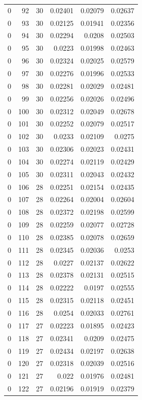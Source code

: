 \begin{tabular}{rrrrrr}
0 & 92 & 30 & 0.02401 & 0.02079 & 0.02637 \\
0 & 93 & 30 & 0.02125 & 0.01941 & 0.02356 \\
0 & 94 & 30 & 0.02294 & 0.0208 & 0.02503 \\
0 & 95 & 30 & 0.0223 & 0.01998 & 0.02463 \\
0 & 96 & 30 & 0.02324 & 0.02025 & 0.02579 \\
0 & 97 & 30 & 0.02276 & 0.01996 & 0.02533 \\
0 & 98 & 30 & 0.02281 & 0.02029 & 0.02481 \\
0 & 99 & 30 & 0.02256 & 0.02026 & 0.02496 \\
0 & 100 & 30 & 0.02312 & 0.02049 & 0.02678 \\
0 & 101 & 30 & 0.02252 & 0.02079 & 0.02517 \\
0 & 102 & 30 & 0.0233 & 0.02109 & 0.0275 \\
0 & 103 & 30 & 0.02306 & 0.02023 & 0.02431 \\
0 & 104 & 30 & 0.02274 & 0.02119 & 0.02429 \\
0 & 105 & 30 & 0.02311 & 0.02043 & 0.02432 \\
0 & 106 & 28 & 0.02251 & 0.02154 & 0.02435 \\
0 & 107 & 28 & 0.02264 & 0.02004 & 0.02604 \\
0 & 108 & 28 & 0.02372 & 0.02198 & 0.02599 \\
0 & 109 & 28 & 0.02259 & 0.02077 & 0.02728 \\
0 & 110 & 28 & 0.02385 & 0.02078 & 0.02659 \\
0 & 111 & 28 & 0.02345 & 0.02036 & 0.0253 \\
0 & 112 & 28 & 0.0227 & 0.02137 & 0.02622 \\
0 & 113 & 28 & 0.02378 & 0.02131 & 0.02515 \\
0 & 114 & 28 & 0.02222 & 0.0197 & 0.02555 \\
0 & 115 & 28 & 0.02315 & 0.02118 & 0.02451 \\
0 & 116 & 28 & 0.0254 & 0.02033 & 0.02761 \\
0 & 117 & 27 & 0.02223 & 0.01895 & 0.02423 \\
0 & 118 & 27 & 0.02341 & 0.0209 & 0.02475 \\
0 & 119 & 27 & 0.02434 & 0.02197 & 0.02638 \\
0 & 120 & 27 & 0.02318 & 0.02039 & 0.02516 \\
0 & 121 & 27 & 0.022 & 0.01976 & 0.02481 \\
0 & 122 & 27 & 0.02196 & 0.01919 & 0.02379 \\

\end{tabular}
